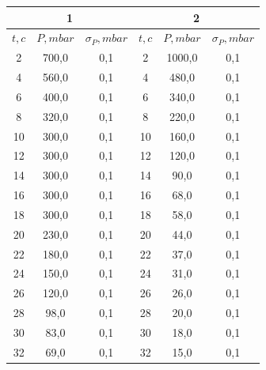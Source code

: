 \documentclass[a4paper, 12pt]{article}%
\begin{document}
\begin{enumerate}
\begin{tabular}{|c|c|c||ccc}
\hline
\multicolumn{3}{|c|}{1} & \multicolumn{3}{c|}{2} \\ \hline
$t, c$ & $P, mbar$ & $\sigma_P, mbar$ & \multicolumn{1}{c|}{$t, c$} & \multicolumn{1}{c|}{$P, mbar$} & \multicolumn{1}{c|}{$\sigma_P, mbar$} \\ \hline
2 & 700,0 & 0,1 & \multicolumn{1}{c|}{2} & \multicolumn{1}{c|}{1000,0} & \multicolumn{1}{c|}{0,1} \\ \hline
4 & 560,0 & 0,1 & \multicolumn{1}{c|}{4} & \multicolumn{1}{c|}{480,0} & \multicolumn{1}{c|}{0,1} \\ \hline
6 & 400,0 & 0,1 & \multicolumn{1}{c|}{6} & \multicolumn{1}{c|}{340,0} & \multicolumn{1}{c|}{0,1} \\ \hline
8 & 320,0 & 0,1 & \multicolumn{1}{c|}{8} & \multicolumn{1}{c|}{220,0} & \multicolumn{1}{c|}{0,1} \\ \hline
10 & 300,0 & 0,1 & \multicolumn{1}{c|}{10} & \multicolumn{1}{c|}{160,0} & \multicolumn{1}{c|}{0,1} \\ \hline
12 & 300,0 & 0,1 & \multicolumn{1}{c|}{12} & \multicolumn{1}{c|}{120,0} & \multicolumn{1}{c|}{0,1} \\ \hline
14 & 300,0 & 0,1 & \multicolumn{1}{c|}{14} & \multicolumn{1}{c|}{90,0} & \multicolumn{1}{c|}{0,1} \\ \hline
16 & 300,0 & 0,1 & \multicolumn{1}{c|}{16} & \multicolumn{1}{c|}{68,0} & \multicolumn{1}{c|}{0,1} \\ \hline
18 & 300,0 & 0,1 & \multicolumn{1}{c|}{18} & \multicolumn{1}{c|}{58,0} & \multicolumn{1}{c|}{0,1} \\ \hline
20 & 230,0 & 0,1 & \multicolumn{1}{c|}{20} & \multicolumn{1}{c|}{44,0} & \multicolumn{1}{c|}{0,1} \\ \hline
22 & 180,0 & 0,1 & \multicolumn{1}{c|}{22} & \multicolumn{1}{c|}{37,0} & \multicolumn{1}{c|}{0,1} \\ \hline
24 & 150,0 & 0,1 & \multicolumn{1}{c|}{24} & \multicolumn{1}{c|}{31,0} & \multicolumn{1}{c|}{0,1} \\ \hline
26 & 120,0 & 0,1 & \multicolumn{1}{c|}{26} & \multicolumn{1}{c|}{26,0} & \multicolumn{1}{c|}{0,1} \\ \hline
28 & 98,0 & 0,1 & \multicolumn{1}{c|}{28} & \multicolumn{1}{c|}{20,0} & \multicolumn{1}{c|}{0,1} \\ \hline
30 & 83,0 & 0,1 & \multicolumn{1}{c|}{30} & \multicolumn{1}{c|}{18,0} & \multicolumn{1}{c|}{0,1} \\ \hline
32 & 69,0 & 0,1 & \multicolumn{1}{c|}{32} & \multicolumn{1}{c|}{15,0} & \multicolumn{1}{c|}{0,1} \\ \hline

\end{tabular}
\end{enumerate}
\end{document}
